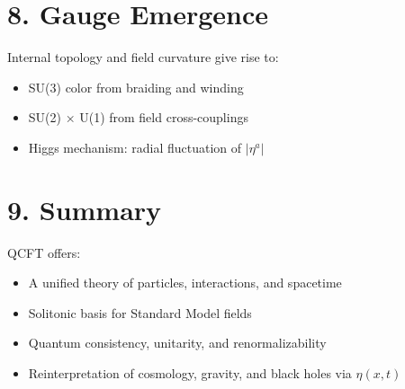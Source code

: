 \documentclass[12pt]{article}
\begin{document}
\section*{8. Gauge Emergence}

Internal topology and field curvature give rise to:
\begin{itemize}
  \item SU(3) color from braiding and winding
  \item SU(2) × U(1) from field cross-couplings
  \item Higgs mechanism: radial fluctuation of $|\eta^a|$
\end{itemize}

\section*{9. Summary}

QCFT offers:
\begin{itemize}
  \item A unified theory of particles, interactions, and spacetime
  \item Solitonic basis for Standard Model fields
  \item Quantum consistency, unitarity, and renormalizability
  \item Reinterpretation of cosmology, gravity, and black holes via $\eta(x,t)$
\end{itemize}
\end{document}
